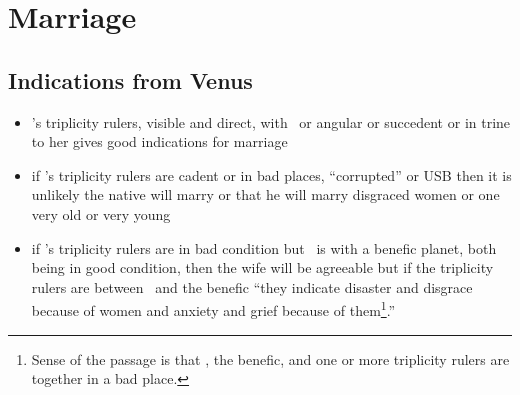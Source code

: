 \section{Marriage}
\subsection{Indications from Venus}
\begin{itemize}[topsep=0em,itemsep=0em]
\item \Venus's triplicity rulers, visible and direct, with \Venus\, or angular or succedent or in trine to her gives good indications for marriage

\item if \Venus's triplicity rulers are cadent or in bad places, ``corrupted'' or USB then it is unlikely the native will marry or that he will marry disgraced women or one very old or very young

\item if \Venus's triplicity rulers are in bad condition but \Venus\, is with a benefic planet, both being in good condition, then the wife will be agreeable but if the triplicity rulers are between \Venus\, and the benefic ``they indicate disaster and disgrace because of women and anxiety and grief because of them\footnote{Sense of the passage is that \Venus, the benefic, and one or more triplicity rulers are together in a bad place.}.''
\end{itemize}